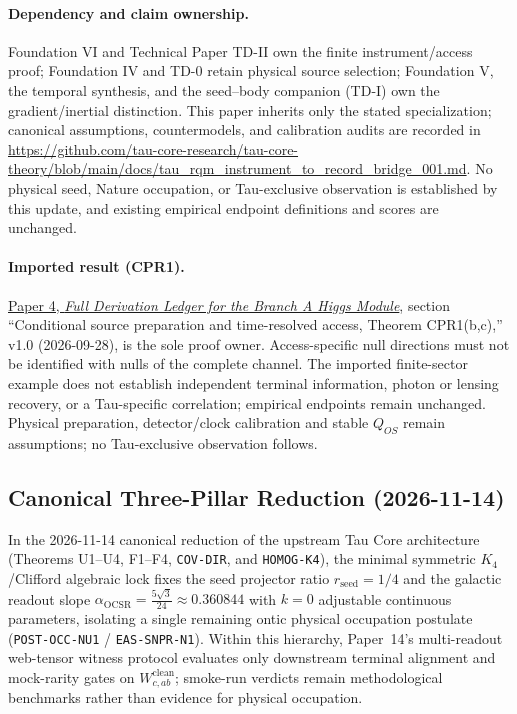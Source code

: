 \documentclass[11pt]{article}
\begin{document}
\paragraph{Dependency and claim ownership.}
Foundation VI and Technical Paper TD-II own the finite instrument/access proof;
Foundation IV and TD-0 retain physical source selection; Foundation V, the
temporal synthesis, and the seed--body companion (TD-I) own the
gradient/inertial distinction. This paper inherits only the stated
specialization; canonical assumptions, countermodels, and calibration audits are
recorded in
\url{https://github.com/tau-core-research/tau-core-theory/blob/main/docs/tau_rqm_instrument_to_record_bridge_001.md}.
No physical seed, Nature occupation, or Tau-exclusive observation is established
by this update, and existing empirical endpoint definitions and scores are
unchanged.

\paragraph{Imported result (CPR1).}
\href{https://github.com/tau-core-research/tau-core-higgs-module-paper4/blob/main/paper4_full_derivation/full_derivation.pdf#nameddest=cpr1}{Paper 4, \emph{Full Derivation Ledger for the Branch A Higgs Module}}, section ``Conditional source preparation and time-resolved access, Theorem CPR1(b,c),'' v1.0 (2026-09-28), is the sole proof owner.
Access-specific null directions must not be identified with nulls of the complete channel. The imported finite-sector example does not establish independent terminal information, photon or lensing recovery, or a Tau-specific correlation; empirical endpoints remain unchanged.
Physical preparation, detector/clock calibration and stable $Q_{OS}$ remain assumptions; no Tau-exclusive observation follows.

\subsection{Canonical Three-Pillar Reduction (2026-11-14)}
In the 2026-11-14 canonical reduction of the upstream Tau Core architecture
(Theorems U1--U4, F1--F4, \texttt{COV-DIR}, and \texttt{HOMOG-K4}), the minimal
symmetric $K_4$/Clifford algebraic lock fixes the seed projector ratio
$r_{\mathrm{seed}} = 1/4$ and the galactic readout slope
$\alpha_{\mathrm{OCSR}} = \frac{5\sqrt{3}}{24} \approx 0.360844$ with $k = 0$
adjustable continuous parameters, isolating a single remaining ontic physical
occupation postulate (\texttt{POST-OCC-NU1} / \texttt{EAS-SNPR-N1}). Within
this hierarchy, Paper~14's multi-readout web-tensor witness protocol evaluates
only downstream terminal alignment and mock-rarity gates on $W^{\mathrm{clean}}_{c,ab}$;
smoke-run verdicts remain methodological benchmarks rather than evidence for
physical occupation.
\end{document}
